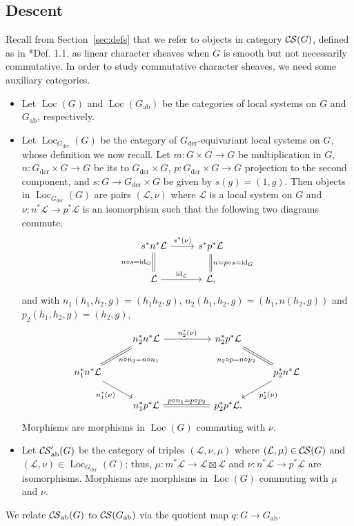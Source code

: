 \documentclass[10pt]{amsart}
\theoremstyle{plain}
\theoremstyle{definition}
\DeclareMathOperator{\id}{id}
\DeclareMathOperator{\Loc}{Loc}
\newcommand{\der}{_{\operatorname{der}}}
\newcommand{\ab}{_{\operatorname{ab}}}
\newcommand{\cs}[1]{{\mathcal{#1}}}
\newcommand{\CS}{{\mathcal{C\hskip-0.8pt S}}}
\newcommand{\CSab}{\CS_{\operatorname{ab}}}
\begin{document}
\subsection{Descent}

Recall from Section~\ref{sec:defs} that we refer to objects in category $\CS(G)$, defined as
in \cite{cunningham-roe:13a}*{Def. 1.1}, as linear character sheaves when $G$ is smooth but
not necessarily commutative.  
In order to study commutative character sheaves, we need some auxiliary categories.
\begin{itemize}
\item Let $\Loc(G)$ and $\Loc(G\ab)$ be the categories of local systems on $G$ and $G\ab$, respectively.
\item Let $\Loc_{G\der}(G)$ be the category of $G\der$-equivariant local systems on $G$, whose definition we now recall.
Let $m : G\times G\to G$ be multiplication in $G$, $n : G\der\times G\to G$ be its to $G\der\times G$,
$p : G\der\times G \to G$ projection to the second component, and $s: G \to G\der\times G$ be given by $s(g) = (1,g)$.
Then objects in $\Loc_{G\der}(G)$ are pairs $(\cs{L},\nu)$ where $\cs{L}$ is a local system on $G$ and
$\nu : n^*\cs{L} \to p^*\cs{L}$ is an isomorphism such that the following two diagrams commute.
\[
\begin{tikzcd}
s^*n^*\cs{L} \arrow{r}{s^*(\nu)} & s^*p^*\cs{L}\\
\cs{L} \arrow[equal]{u}{n\circ s = \id_G}  \arrow{r}{\id_{\cs{L}}} & \cs{L} \arrow[equal]{u}[swap]{n=p\circ s = \id_G},
\end{tikzcd}
\]
and with $n_1(h_1,h_2,g) = (h_1h_2,g)$, $n_2(h_1,h_2,g) = (h_1,n(h_2,g))$ and $p_2(h_1,h_2,g) = (h_2,g)$,
\[
\begin{tikzcd}
& \arrow[equal]{dl}{n\circ n_2=n\circ n_1} n_2^*n^*\cs{L} \arrow{rr}{n_2^*(\nu)} && n_2^*p^*\cs{L} \arrow[equal]{dr}[swap]{n_2\circ p = n\circ p_2}& \\
n_1^*n^*\cs{L} \arrow{dr}[swap]{n_1^*(\nu)} &&&& \arrow{dl}{p_2^*(\nu)} p_2^*n^*\cs{L}\\
& n_1^*p^*\cs{L} \arrow[equal]{rr}{p\circ n_1 = p\circ p_2} && p_2^*p^*\cs{L} .
\end{tikzcd}
\]
Morphisms are morphisms in $\Loc(G)$ commuting with $\nu$.
\item Let $\CSab'(G)$ be the category of triples $(\cs{L},\nu,\mu)$ where $(\cs{L},\mu)\in \CS(G)$ and $(\cs{L},\nu)\in \Loc_{G\der}(G)$; thus, $\mu : m^*\cs{L} \to \cs{L}\boxtimes\cs{L}$ and $\nu :  n^*\cs{L} \to p^*\cs{L}$ are isomorphisms.
Morphisms are morphisms in $\Loc(G)$ commuting with $\mu$ and $\nu$. 
\end{itemize}
We relate $\CSab(G)$ to $\CS(G\ab)$ via the quotient map $q : G \to G\ab$.
\end{document}
